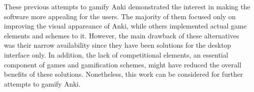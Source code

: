 These previous attempts to gamify Anki demonstrated the interest in making the software more appealing for the users. The majority of them focused only on improving the visual appareance of Anki, while others implemented actual game elements and schemes to it. However, the main drawback of these alternatives was their narrow availability since they have been solutions for the desktop interface only. In addition, the lack of competitional elements, an essential component of games and gamification schemes, might have reduced the overall benefits of these solutions. Nonetheless, this work can be considered for further attempts to gamify Anki.
